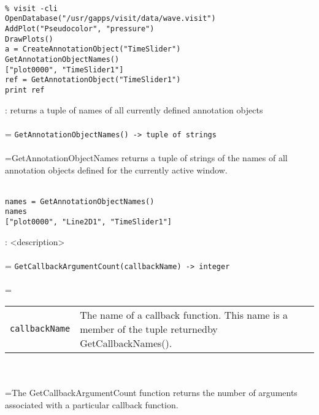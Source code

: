 \documentclass[10pt,a4paper]{report}
\begin{document}
\\[-6mm]
\begin{verbatim}% visit -cli
OpenDatabase("/usr/gapps/visit/data/wave.visit")
AddPlot("Pseudocolor", "pressure")
DrawPlots()
a = CreateAnnotationObject("TimeSlider")
GetAnnotationObjectNames()
["plot0000", "TimeSlider1"]
ref = GetAnnotationObject("TimeSlider1")
print ref
\end{verbatim}
\newpage


{}
: returns a tuple of names of all currently defined annotation objects\\[-3mm]

 \\ 
\hangindent=\parindent 
\verb!GetAnnotationObjectNames() -> tuple of strings!\\ [-3mm]

 \\ 
\hangindent=\parindent GetAnnotationObjectNames returns a tuple of strings of the names of all annotation objects defined for the currently active window. \\[-3mm] 

\\[-6mm]
\begin{verbatim}names = GetAnnotationObjectNames()
names
["plot0000", "Line2D1", "TimeSlider1"]
\end{verbatim}
\newpage


{}
: <description>\\[-3mm]

 \\ 
\hangindent=\parindent 
\verb!GetCallbackArgumentCount(callbackName) -> integer!\\ [-3mm]

 \\ 
\hangindent=\parindent 
\begin{tabular}{lp{9cm}}
\verb!callbackName! & The name of a callback function. This name is a member of the tuple returnedby GetCallbackNames(). \\
\end{tabular} \\[-2mm]


 \\ 
\hangindent=\parindent The GetCallbackArgumentCount function returns the number of arguments  associated with a particular callback function. \\[-3mm] 
\end{document}
